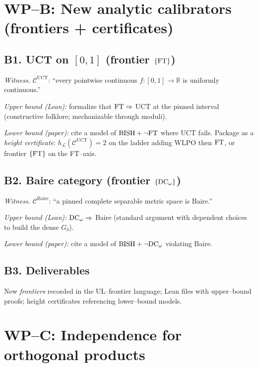 \documentclass[11pt]{article}
\theoremstyle{definition}
\theoremstyle{remark}
\newcommand{\WLPO}{\mathrm{WLPO}}
\newcommand{\BISH}{\mathrm{BISH}}
\begin{document}
\section{WP–B: New analytic calibrators (frontiers + certificates)}

\subsection{B1. UCT on \([0,1]\) (frontier $\{\mathrm{FT}\}$)}
\emph{Witness.} $\mathcal C^{\mathrm{UCT}}$: “every pointwise continuous $f:[0,1]\to\mathbb R$ is uniformly continuous.”

\emph{Upper bound (Lean):} formalize that \(\mathrm{FT}\Rightarrow\) UCT at the pinned interval (constructive folklore; mechanizable through moduli).

\emph{Lower bound (paper):} cite a model of \(\BISH+\neg \FT\) where UCT fails. Package as a \emph{height certificate}:
\(h_{\mathcal L}(\mathcal C^{\mathrm{UCT}})=2\) on the ladder adding \(\WLPO\) then \(\mathrm{FT}\), or frontier \(\{\mathrm{FT}\}\) on the FT–axis.

\subsection{B2. Baire category (frontier $\{\mathrm{DC}_\omega\}$)}
\emph{Witness.} $\mathcal C^{\mathrm{Baire}}$: “a pinned complete separable metric space is Baire.”

\emph{Upper bound (Lean):} \(\mathrm{DC}_\omega\Rightarrow\) Baire (standard argument with dependent choices to build the dense $G_\delta$).

\emph{Lower bound (paper):} cite a model of \(\BISH+\neg\DCw\) violating Baire.

\subsection{B3. Deliverables}
New \emph{frontiers} recorded in the UL–frontier language; Lean files with upper–bound proofs; height certificates referencing lower–bound models.

\section{WP–C: Independence for orthogonal products}
\end{document}
